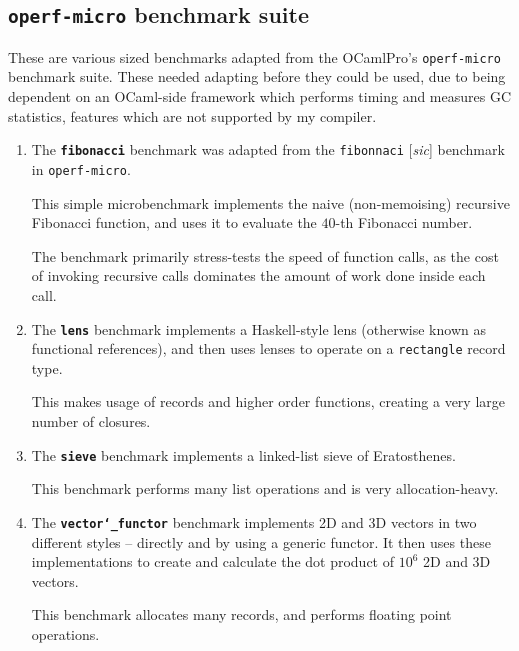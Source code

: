 \documentclass[12pt,a4paper,twoside,openright]{report}
\begin{document}
\subsection{\texttt{operf-micro} benchmark suite}
These are various sized benchmarks adapted from the OCamlPro's
      \lstinline!operf-micro! benchmark suite. These needed adapting before
      they could be used, due to being dependent on an OCaml-side framework
      which performs timing and measures GC statistics, features which are not
      supported by my compiler.
\begin{enumerate}

  \item
    The \textbf{\texttt{fibonacci}} benchmark was adapted from the \lstinline!fibonnaci!
[\textit{sic}] benchmark in \lstinline!operf-micro!.

This simple microbenchmark implements the naive (non-memoising) recursive
Fibonacci function, and uses it to evaluate the $40$-th Fibonacci number.

The benchmark primarily stress-tests the speed of function calls, as the cost
of invoking recursive calls dominates the amount of work done inside each call.

\item

  The \textbf{\texttt{lens}} benchmark implements a Haskell-style lens (otherwise known as
functional references), and then uses lenses to operate on a
\lstinline!rectangle! record type.

This makes usage of records and higher order functions, creating a very large
number of closures.

\item

  The \textbf{\texttt{sieve}} benchmark implements a linked-list sieve of Eratosthenes.

This benchmark performs many list operations and is very allocation-heavy.

\item

  The \textbf{\texttt{vector\char`_functor}} benchmark implements 2D and 3D vectors in two
different styles -- directly and by using a generic functor. It then uses these
implementations to create and calculate the dot product of $10^6$ 2D and 3D
vectors.

This benchmark allocates many records, and performs floating point operations.
\end{enumerate}
\end{document}
